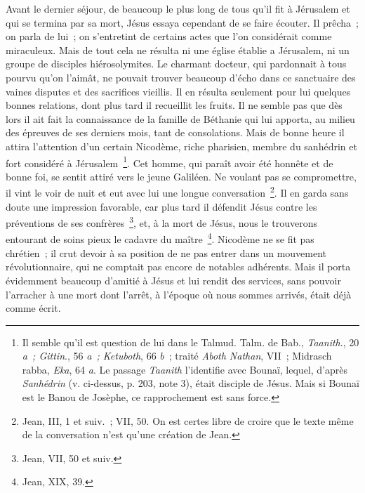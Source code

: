 \documentclass[french,twoside]{book} %
\begin{document}
Avant le dernier séjour, de beaucoup le plus long de tous qu’il fit à Jérusalem et qui se termina par sa mort, Jésus essaya cependant de se faire écouter. Il prêcha ; on parla de lui ; on s’entretint de certains actes que l’on considérait comme miraculeux. Mais de tout cela ne résulta ni une église établie a Jérusalem, ni un groupe de disciples hiérosolymites. Le charmant docteur, qui pardonnait à tous pourvu qu’on l’aimât, ne pouvait trouver beaucoup d’écho dans ce sanctuaire des vaines disputes et des sacrifices vieillis. Il en résulta seulement pour lui quelques bonnes relations, dont plus tard il recueillit les fruits. Il ne semble pas que dès lors il ait fait la connaissance de la famille de Béthanie qui lui apporta, au milieu des épreuves de ses derniers mois, tant de consolations. Mais de bonne heure il attira l’attention d’un certain Nicodème, riche pharisien, membre du sanhédrin et fort considéré à Jérusalem \footnote{ Il semble qu’il est question de lui dans le Talmud. Talm. de Bab., {\itshape Taanith}., 20 {\itshape a ; Gittin}., 56 {\itshape a ; Ketuboth}, 66 {\itshape b} ; traité {\itshape Aboth Nathan}, VII ; Midrasch rabba, {\itshape Eka}, 64 {\itshape a}. Le passage {\itshape Taanith} l’identifie avec Bounaï, lequel, d’après {\itshape Sanhédrin} (v. ci-dessus, p. 203, note 3), était disciple de Jésus. Mais si Bounaï est le Banou de Josèphe, ce rapprochement est sans force.}. Cet homme, qui paraît avoir été honnête et de bonne foi, se sentit attiré vers le jeune Galiléen. Ne voulant pas se compromettre, il vint le voir de nuit et eut avec lui une longue conversation \footnote{Jean, III, 1 et suiv. ; VII, 50. On est certes libre de croire que le texte même de la conversation n’est qu’une création de Jean.}. Il en garda sans doute une impression favorable, car plus tard il défendit Jésus contre les préventions de ses confrères \footnote{Jean, VII, 50 et suiv.}, et, à la mort de Jésus, nous le trouverons entourant de soins pieux le cadavre du maître \footnote{Jean, XIX, 39.}. Nicodème ne se fit pas chrétien ; il crut devoir à sa position de ne pas entrer dans un mouvement révolutionnaire, qui ne comptait pas encore de notables adhérents. Mais il porta évidemment beaucoup d’amitié à Jésus et lui rendit des services, sans pouvoir l’arracher à une mort dont l’arrêt, à l’époque où nous sommes arrivés, était déjà comme écrit.\par
\end{document}
